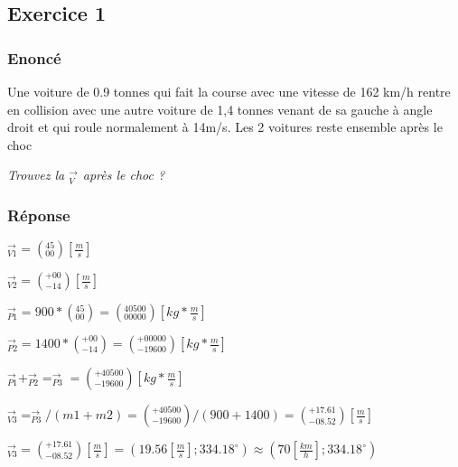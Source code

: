 \subsection{Exercice 1}
\subsubsection{Enoncé}
Une voiture de 0.9 tonnes qui fait la course avec une vitesse de 162 km/h rentre en collision avec une autre voiture de 1,4 tonnes venant de sa gauche à angle droit et qui roule normalement à 14m/s.
Les 2 voitures reste ensemble après le choc

\textit{Trouvez la $_{V}^\rightarrow$ après le choc ?}

\subsubsection{Réponse}
$_{V1}^\rightarrow = (_{00}^{45})[\frac{m}{s}]$

$_{V2}^\rightarrow = (_{-14}^{+00})[\frac{m}{s}]$


$_{P1}^\rightarrow = 900 * (_{00}^{45}) = (_{00000}^{40500})[kg*\frac{m}{s}]$

$_{P2}^\rightarrow = 1400 * (_{-14}^{+00}) = (_{-19600}^{+00000})[kg*\frac{m}{s}]$

$_{P1}^\rightarrow + _{P2}^\rightarrow = _{P3}^\rightarrow = (_{-19600}^{+40500})[kg*\frac{m}{s}]$

$_{V3}^\rightarrow =  _{P3}^\rightarrow / (m1+m2) =  (_{-19600}^{+40500}) / (900+1400) = (_{-08.52}^{+17.61})[\frac{m}{s}]$

$_{V3}^\rightarrow = (_{-08.52}^{+17.61})[\frac{m}{s}] = (19.56[\frac{m}{s}] ; 334.18^{\circ} ) \approx (70[\frac{km}{h}];334.18^{\circ} )$
